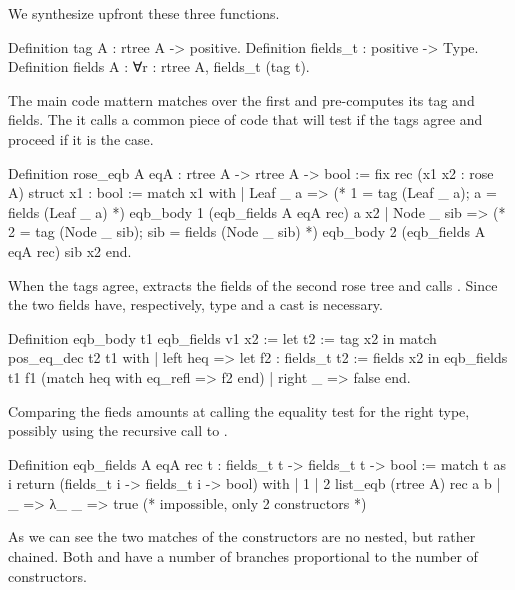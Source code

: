 \documentclass[a4paper, 11pt]{book}
\begin{document}
We synthesize upfront these three functions.

\begin{rocqcode}
Definition tag A : rtree A -> positive.
Definition fields_t : positive -> Type.
Definition fields A :  ∀r : rtree A, fields_t (tag t).
\end{rocqcode}

The main code mattern matches over the first  and 
pre-computes its tag and fields. The it calls a common piece of
code  that will test if the tags agree and proceed
if it is the case.

\begin{rocqcode}
Definition rose_eqb A eqA : rtree A -> rtree A -> bool := 
  fix rec (x1 x2 : rose A) {struct x1} : bool :=
    match x1 with
    | Leaf _ a =>
        (* 1 = tag (Leaf _ a); a = fields (Leaf _ a) *)
        eqb_body 1 (eqb_fields A eqA rec) a x2
    | Node _ sib =>            
        (* 2 = tag (Node _ sib); sib = fields (Node _ sib) *)
        eqb_body 2 (eqb_fields A eqA rec) sib x2
    end.
\end{rocqcode}

When the tags agree,  extracts the fields
of the second rose tree and calls .
Since the two fields have, respectively, type 
 and  a cast is necessary.

\begin{rocqcode}
Definition eqb_body t1 eqb_fields v1 x2 :=
  let t2 := tag x2 in
  match pos_eq_dec t2 t1 with
  | left heq =>
    let f2 : fields_t t2 := fields x2 in
    eqb_fields t1 f1 (match heq with eq_refl => f2 end)
  | right _ => false
  end.
\end{rocqcode}

Comparing the fieds amounts at calling the equality test for the
right type, possibly using the recursive call to .

\begin{rocqcode}
Definition eqb_fields A eqA rec t :
  fields_t t -> fields_t t -> bool
:=
  match t as i return (fields_t i -> fields_t i -> bool) with
  | 1%
  | 2%
                    list_eqb (rtree A) rec a b
  | _ => λ_ _ => true (* impossible, only 2 constructors *)
\end{rocqcode}

As we can see the two matches of the constructors are no nested, but rather
chained. Both  and  have a number
of branches proportional to the number of constructors.
\end{document}
